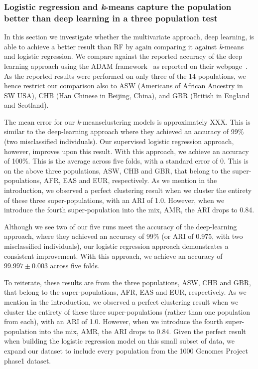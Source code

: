 \documentclass{llncs}
\newcommand{\kMeans}{\textit{k}-means}
\begin{document}
{\FloatBarrier
\clearpage
{}
\subsubsection{Logistic regression and \kMeans{} capture the population better than deep learning in a three population test}
In this section we investigate whether the multivariate approach, deep learning, is able to achieve a better result than
RF by again comparing it against \kMeans{} and logistic regression.  We compare against the reported accuracy of the
deep learning approach using the {\sc ADAM} framework~\cite{Massie2013} as reported on their webpage~\cite{Ferguson}.
As the reported results were performed on only three of the 14 populations, we hence restrict our comparison also to ASW
(Americans of African Ancestry in SW USA), CHB (Han Chinese in Beijing, China), and GBR (British in England and
Scotland).

The mean error for our \kMeans clustering models is approximately XXX. This is similar to the deep-learning approach
where they achieved an accuracy of 99\% (two misclassified individuals). Our supervised logistic regression approach,
however, improves upon this result.  With this approach, we achieve an accuracy of 100\%. This is the average across
five folds, with a standard error of 0. This is on the above three populations, ASW, CHB and GBR, that belong to the
super-populations, AFR, EAS and EUR, respectively.  As we mention in the introduction, we observed a perfect clustering
result when we cluster the entirety of these three super-populations, with an ARI of 1.0. However, when we introduce the
fourth super-population into the mix, AMR, the ARI drops to 0.84.

Although we see two of our five runs meet the accuracy of the deep-learning approach, where they achieved an accuracy of
99\% (or ARI of 0.975, with two misclassified individuals), our logistic regression approach demonstrates a consistent
improvement.  With this approach, we achieve an accuracy of \(99.997 \pm 0.003\) across five folds.

To reiterate, these results are from the three populations, ASW, CHB and GBR, that belong to the super-populations, AFR,
EAS and EUR, respectively.  As we mention in the introduction, we observed a perfect clustering result when we cluster
the entirety of these three super-populations (rather than one population from each), with an ARI of 1.0. However, when
we introduce the fourth super-population into the mix, AMR, the ARI drops to 0.84.  Given the perfect result when building
the logistic regression model on this small subset of data, we expand our dataset to include every population from the
1000 Genomes Project phase1 dataset.

}
\end{document}
